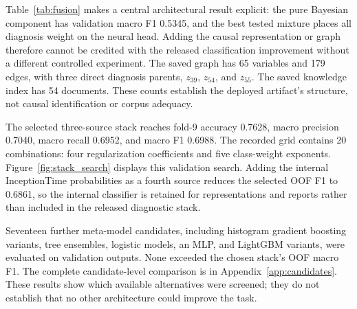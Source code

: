 
\begin{table}[htbp]\centering\small

\caption{Internal Bayesian/neural fusion candidates on fold~9 before class-bias calibration. Selection is by macro F1. These are validation measurements, not independent ablations on an untouched test set.}\label{tab:fusion}\end{table}

Table~\ref{tab:fusion} makes a central architectural result explicit: the pure Bayesian component has validation macro F1 0.5345, and the best tested mixture places all diagnosis weight on the neural head. Adding the causal representation or graph therefore cannot be credited with the released classification improvement without a different controlled experiment. The saved graph has 65 variables and 179 edges, with three direct diagnosis parents, $z_{39}$, $z_{54}$, and $z_{55}$. The saved knowledge index has 54 documents. These counts establish the deployed artifact's structure, not causal identification or corpus adequacy.

The selected three-source stack reaches fold-9 accuracy 0.7628, macro precision 0.7040, macro recall 0.6952, and macro F1 0.6988. The recorded grid contains 20 combinations: four regularization coefficients and five class-weight exponents. Figure~\ref{fig:stack_search} displays this validation search. Adding the internal InceptionTime probabilities as a fourth source reduces the selected OOF F1 to 0.6861, so the internal classifier is retained for representations and reports rather than included in the released diagnostic stack.


Seventeen further meta-model candidates, including histogram gradient boosting variants, tree ensembles, logistic models, an MLP, and LightGBM variants, were evaluated on validation outputs. None exceeded the chosen stack's OOF macro F1. The complete candidate-level comparison is in Appendix~\ref{app:candidates}. These results show which available alternatives were screened; they do not establish that no other architecture could improve the task.

